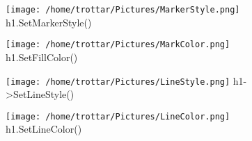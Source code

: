\documentclass[11pt]{article}
\begin{document}
\begin{figure}[htbp]
\centering
\texttt{[image: /home/trottar/Pictures/MarkerStyle.png]}
h1.SetMarkerStyle()
\end{figure}
\begin{figure}[htbp]
\centering
\texttt{[image: /home/trottar/Pictures/MarkColor.png]}
h1.SetFillColor()
\end{figure}
\begin{figure}[htbp]
\centering
\texttt{[image: /home/trottar/Pictures/LineStyle.png]}
h1->SetLineStyle()
\end{figure}
\begin{figure}[htbp]
\centering
\texttt{[image: /home/trottar/Pictures/LineColor.png]}
h1.SetLineColor()
\end{figure}
\end{document}
